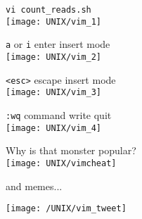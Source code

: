 \documentclass[xcolor=dvipsnames]{beamer}
\begin{document}
\begin{frame}[fragile]
	\begin{center}
		\Large
		\verb!vi count_reads.sh! \\
		\vspace{1cm}
		\texttt{[image: UNIX/vim\_1]}
	\end{center}
\end{frame}

\begin{frame}[fragile]
	\begin{center}
		\Large
		\verb!a! or \verb!i! enter insert mode \\
		\vspace{1cm}
		\texttt{[image: UNIX/vim\_2]}
	\end{center}
\end{frame}

\begin{frame}[fragile]
	\begin{center}
		\Large
		\verb!<esc>! escape insert mode\\
		\vspace{1cm}
		\texttt{[image: UNIX/vim\_3]}
	\end{center}
\end{frame}

\begin{frame}[fragile]
	\begin{center}
		\Large
		\verb!:wq! command write quit\\
		\vspace{1cm}
		\texttt{[image: UNIX/vim\_4]}
	\end{center}
\end{frame}

\begin{frame}
	\begin{center}
		\Huge
		Why is that monster popular?\\
		\vspace{1cm}
		\texttt{[image: UNIX/vimcheat]}
	\end{center}
	\hfill and memes...
\end{frame}	

\begin{frame}
	\begin{center}
		\texttt{[image: /UNIX/vim\_tweet]}
	\end{center}
\end{frame}
\end{document}
